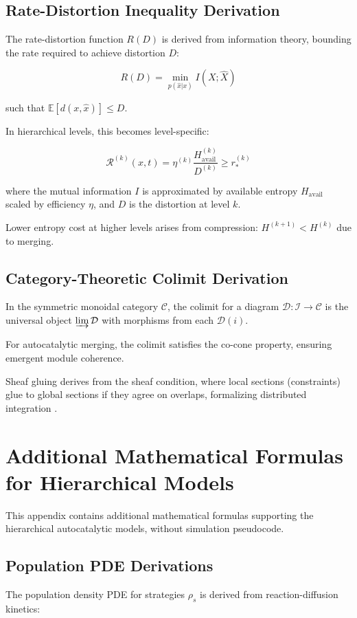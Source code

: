 \documentclass{book}
\begin{document}
\section{Rate-Distortion Inequality Derivation}
The rate-distortion function $R(D)$ is derived from information theory, bounding the rate required to achieve distortion $D$:

\[R(D) = \min_{p(\hat{x}|x)} I(X; \hat{X})\]

such that $\mathbb{E}[d(x, \hat{x})] \le D$.

In hierarchical levels, this becomes level-specific:

\[ \mathcal{R}^{(k)}(x,t) = \eta^{(k)} \frac{H^{(k)}_{\mathrm{avail}}}{D^{(k)}} \ge r_\ast^{(k)} \]

where the mutual information $I$ is approximated by available entropy $H_{\mathrm{avail}}$ scaled by efficiency $\eta$, and $D$ is the distortion at level $k$.

Lower entropy cost at higher levels arises from compression: $H^{(k+1)} < H^{(k)}$ due to merging.

\section{Category-Theoretic Colimit Derivation}
In the symmetric monoidal category $\mathcal{C}$, the colimit for a diagram $\mathcal{D}: \mathcal{I} \to \mathcal{C}$ is the universal object $\varinjlim \mathcal{D}$ with morphisms from each $\mathcal{D}(i)$.

For autocatalytic merging, the colimit satisfies the co-cone property, ensuring emergent module coherence.

Sheaf gluing derives from the sheaf condition, where local sections (constraints) glue to global sections if they agree on overlaps, formalizing distributed integration \citep{steel2013}.

\chapter{Additional Mathematical Formulas for Hierarchical Models}
This appendix contains additional mathematical formulas supporting the hierarchical autocatalytic models, without simulation pseudocode.

\section{Population PDE Derivations}
The population density PDE for strategies $\rho_s$ is derived from reaction-diffusion kinetics:
\end{document}

